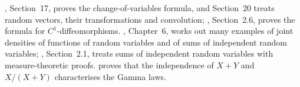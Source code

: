 
\furtherreading
\textcite{billingsley}, Section~17, proves the change-of-variables formula, and Section~20 treats
random vectors, their transformations and convolution; \textcite{folland}, Section~2.6, proves the
formula for $C^1$-diffeomorphisms. \textcite{ross-5}, Chapter~6, works out many examples of joint
densities of functions of random variables and of sums of independent random variables; \textcite{durrett}, Section~2.1, treats sums of independent random variables
with measure-theoretic proofs. \textcite{lukacs-gamma} proves that the independence of $X+Y$ and
$X/(X+Y)$ characterises the Gamma laws.
